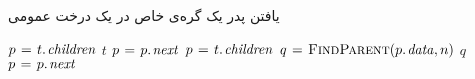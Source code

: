 \begin{algorithm}
\caption{یافتن پدر یک گره‌ی خاص در یک درخت عمومی}\label{ch5:alg:findParent}
\begin{latin}
\begin{algorithmic}[1]
				\State	\Return {}
		\EndIf
		\State	$p \mathrel{\hspace{1pt}=\hspace{1pt}} t.\hspace*{1pt}\mathit{\mathit{children}}$\label{ch5:alg:ln:fndpFrstWhBeg}
						\State	\Return $t$
				\EndIf
				\State	$p \mathrel{\hspace{1pt}=\hspace{1pt}} p.\hspace*{1pt}\mathit{\mathit{next}}$
		\EndWhile\label{ch5:alg:ln:fndpFrstWhEnd}
		\State	$p \mathrel{\hspace{1pt}=\hspace{1pt}} t.\hspace*{1pt}\mathit{\mathit{children}}$\label{ch5:alg:ln:fndpSecWhBeg}		
				\State	$q \gets \Call{FindParent}{\attrib{p}{\id{data}},n}$
						\State	\Return $q$
				\EndIf
				\State	$p \mathrel{\hspace{1pt}=\hspace{1pt}} p.\hspace*{1pt}\mathit{\mathit{next}}$
		\EndWhile\label{ch5:alg:ln:fndpSecWhEnd}
		\State	\Return {}
\EndFunction
\end{algorithmic}
\end{latin}
\end{algorithm}

